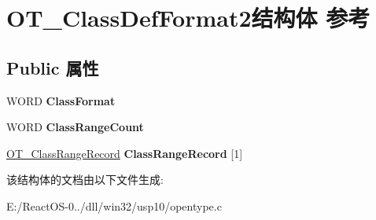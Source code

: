 \hypertarget{struct_o_t___class_def_format2}{}\section{O\+T\+\_\+\+Class\+Def\+Format2结构体 参考}
\label{struct_o_t___class_def_format2}
\subsection*{Public 属性}
\begin{DoxyCompactItemize}
\item 
\mbox{\label{struct_o_t___class_def_format2_a4f36383561176dfe1963708d71bc8db2}} 
W\+O\+RD {\bfseries Class\+Format}
\item 
\mbox{\label{struct_o_t___class_def_format2_a791d864b6a4c2fbf166009d0d76d008b}} 
W\+O\+RD {\bfseries Class\+Range\+Count}
\item 
\mbox{\label{struct_o_t___class_def_format2_ab74bc761294359cdbb742a62ec0d89aa}} 
\hyperlink{struct_o_t___class_range_record}{O\+T\+\_\+\+Class\+Range\+Record} {\bfseries Class\+Range\+Record} \mbox{[}1\mbox{]}
\end{DoxyCompactItemize}


该结构体的文档由以下文件生成\+:\begin{DoxyCompactItemize}
\item 
E\+:/\+React\+O\+S-\/0../dll/win32/usp10/opentype.\+c\end{DoxyCompactItemize}
